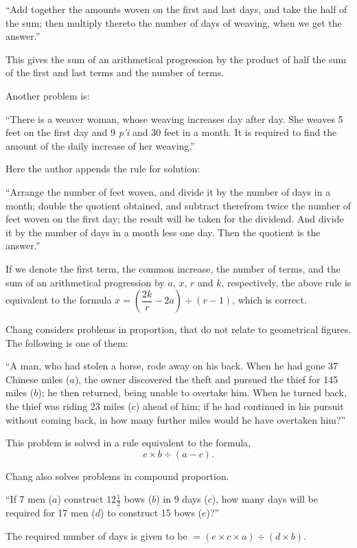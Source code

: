 \documentclass[11pt]{article}
\newcommand{\scanpage}[2]{\clearpage\setcounter{footnote}{0}\noindent{\footnotesize\color{gray}PDF page #1 · #2}\par\medskip}
\newcommand{\scanfooter}{}
\begin{document}
``Add together the amounts woven on the first and last days, and take the half of the sum; then multiply thereto the number of days of weaving, when we get the answer.''

This gives the sum of an arithmetical progression by the product of half the sum of the first and last terms and the number of terms.

Another problem is:

``There is a weaver woman, whose weaving increases day after day. She weaves 5 feet on the first day and 9 \emph{p'i} and 30 feet in a month. It is required to find the amount of the daily increase of her weaving.''

Here the author appends the rule for solution:

``Arrange the number of feet woven, and divide it by the number of days in a month; double the quotient obtained, and subtract therefrom twice the number of feet woven on the first day; the result will be taken for the dividend. And divide it by the number of days in a month less one day. Then the quotient is the answer.''

If we denote the first term, the common increase, the number of terms, and the sum of an arithmetical progression by $a$, $x$, $r$ and $k$, respectively, the above rule is equivalent to the formula $x=\left(\dfrac{2k}{r}-2a\right)\div(r-1)$, which is correct.

Chang considers problems in proportion, that do not relate to geometrical figures. The following is one of them:

``A man, who had stolen a horse, rode away on his back. When he had gone 37 Chinese miles ($a$), the owner discovered the theft and pursued the thief for 145 miles ($b$); he then returned, being unable to overtake him. When he turned back, the thief was riding 23 miles ($c$) ahead of him; if he had continued in his pursuit without coming back, in how many further miles would he have overtaken him?''

This problem is solved in a rule equivalent to the formula,
\[
c\times b\div(a-c).
\]

Chang also solves problems in compound proportion.

``If 7 men ($a$) construct $12\frac{1}{2}$ bows ($b$) in 9 days ($c$), how many days will be required for 17 men ($d$) to construct 15 bows ($e$)?''
\scanfooter

\scanpage{0056}{Part I, printed page 42}

The required number of days is given to be $=(e\times c\times a)\div(d\times b)$.
\end{document}
